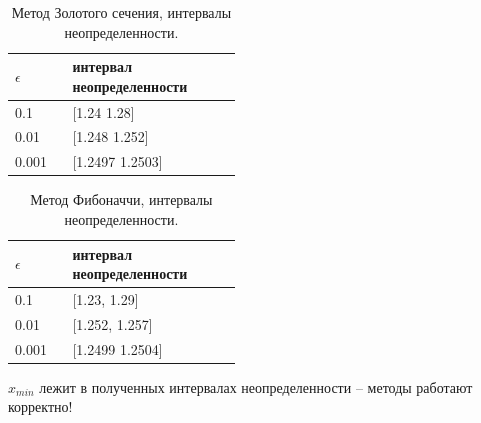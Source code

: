 \documentclass[main.tex]{subfiles}
\begin{document}
	\begin{table}[h]
		\begin{tabular} { | p{0.1\linewidth} | p{0.35\linewidth} |}
			\hline
			$\epsilon$ &  интервал неопределенности  \\ \hline
			0.1 & [1.24 1.28]   \\ \hline
			0.01 & [1.248 1.252] \\ \hline
			0.001 & [1.2497 1.2503]    \\ \hline
		\end{tabular}
		\caption{Метод Золотого сечения, интервалы неопределенности.}
	\end{table}
	
	
	\begin{table}[h]
		\begin{tabular} { | p{0.1\linewidth} | p{0.35\linewidth} |}
			\hline
			$\epsilon$ &  интервал неопределенности  \\ \hline
			0.1 & [1.23, 1.29]   \\ \hline
			0.01 & [1.252, 1.257] \\ \hline
			0.001 & [1.2499 1.2504]    \\ \hline
		\end{tabular}
		\caption{Метод Фибоначчи, интервалы неопределенности.}
	\end{table}
	$x_{min}$ лежит в полученных интервалах неопределенности -- методы работают корректно!
	
	\begin{thebibliography}{99}
		
	\end{thebibliography}
	
	
\end{document}
